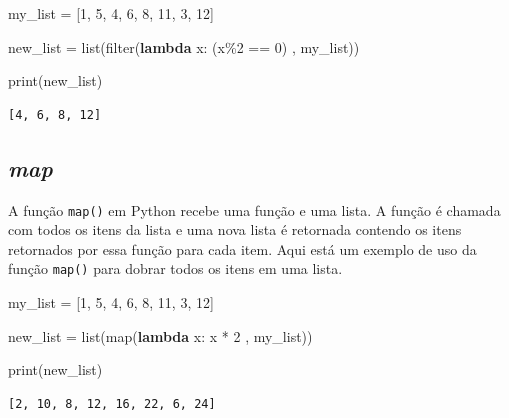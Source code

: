 \documentclass[
  brazilian,
  letterpaper,
  DIV=11,
  numbers=noendperiod]{scrreprt}
\newenvironment{Shaded}{\begin{snugshade}}{\end{snugshade}}
\newcommand{\BuiltInTok}[1]{\textcolor[rgb]{0.00,0.23,0.31}{#1}}
\newcommand{\DecValTok}[1]{\textcolor[rgb]{0.68,0.00,0.00}{#1}}
\newcommand{\KeywordTok}[1]{\textcolor[rgb]{0.00,0.23,0.31}{\textbf{#1}}}
\newcommand{\NormalTok}[1]{\textcolor[rgb]{0.00,0.23,0.31}{#1}}
\newcommand{\OperatorTok}[1]{\textcolor[rgb]{0.37,0.37,0.37}{#1}}
\begin{document}
\begin{Shaded}
\begin{Highlighting}[]
\NormalTok{my\_list }\OperatorTok{=}\NormalTok{ [}\DecValTok{1}\NormalTok{, }\DecValTok{5}\NormalTok{, }\DecValTok{4}\NormalTok{, }\DecValTok{6}\NormalTok{, }\DecValTok{8}\NormalTok{, }\DecValTok{11}\NormalTok{, }\DecValTok{3}\NormalTok{, }\DecValTok{12}\NormalTok{]}

\NormalTok{new\_list }\OperatorTok{=} \BuiltInTok{list}\NormalTok{(}\BuiltInTok{filter}\NormalTok{(}\KeywordTok{lambda}\NormalTok{ x: (x}\OperatorTok{\%}\DecValTok{2} \OperatorTok{==} \DecValTok{0}\NormalTok{) , my\_list))}

\BuiltInTok{print}\NormalTok{(new\_list)}
\end{Highlighting}
\end{Shaded}

\begin{verbatim}
[4, 6, 8, 12]
\end{verbatim}

\subsection{\texorpdfstring{\emph{map}}{map}}\label{map}

A função \texttt{map()} em Python recebe uma função e uma lista. A
função é chamada com todos os itens da lista e uma nova lista é
retornada contendo os itens retornados por essa função para cada item.
Aqui está um exemplo de uso da função \texttt{map()} para dobrar todos
os itens em uma lista.

\begin{Shaded}
\begin{Highlighting}[]
\NormalTok{my\_list }\OperatorTok{=}\NormalTok{ [}\DecValTok{1}\NormalTok{, }\DecValTok{5}\NormalTok{, }\DecValTok{4}\NormalTok{, }\DecValTok{6}\NormalTok{, }\DecValTok{8}\NormalTok{, }\DecValTok{11}\NormalTok{, }\DecValTok{3}\NormalTok{, }\DecValTok{12}\NormalTok{]}

\NormalTok{new\_list }\OperatorTok{=} \BuiltInTok{list}\NormalTok{(}\BuiltInTok{map}\NormalTok{(}\KeywordTok{lambda}\NormalTok{ x: x }\OperatorTok{*} \DecValTok{2}\NormalTok{ , my\_list))}

\BuiltInTok{print}\NormalTok{(new\_list)}
\end{Highlighting}
\end{Shaded}

\begin{verbatim}
[2, 10, 8, 12, 16, 22, 6, 24]
\end{verbatim}
\end{document}
